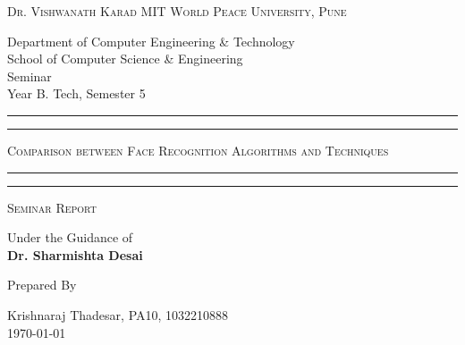\documentclass[openany]{report}
\begin{document}
\begin{titlepage}
    \centering


    \huge\textsc{
        Dr. Vishwanath Karad MIT World Peace University, Pune
    }\\

    \vspace{0.75\baselineskip} %

    \LARGE{
        Department of Computer Engineering \& Technology \\
        School of Computer Science \& Engineering\\
        Seminar\\
        Year B. Tech, Semester 5\\
    }

    \vfill %


    \rule{\textwidth}{1.6pt}\vspace*{-\baselineskip}\vspace*{2pt}
    \rule{\textwidth}{0.6pt}
    \vspace{0.75\baselineskip} %



    \huge{\textsc{
            Comparison between Face Recognition Algorithms and Techniques
        }} \\



    \vspace{0.5\baselineskip} %
    \rule{\textwidth}{0.6pt}\vspace*{-\baselineskip}\vspace*{2.8pt}
    \rule{\textwidth}{1.6pt}

    \vspace{1\baselineskip} %


    \LARGE\textsc{
        Seminar Report
    } %


    \vspace{0.5\baselineskip} %
    Under the Guidance of\\
    \Large{
        \textbf{Dr. Sharmishta Desai}
    }
    \vfill

    Prepared By
    \vspace{0.5\baselineskip} %

    \Large{
        Krishnaraj Thadesar, PA10, 1032210888\\
    }
    \vspace{0.5\baselineskip} %
    \today

\end{titlepage}
\end{document}

